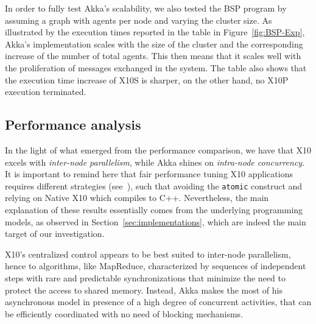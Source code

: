 \documentclass[a4paper]{article}
\numberwithin{equation}{section}
\begin{document}




In order to fully test Akka's scalability, we also tested 
the BSP program by assuming a graph with  agents per node and
varying the cluster size. As illustrated by the execution times
reported in the table in Figure~\ref{fig:BSP-Exp}, Akka's implementation scales with the
size of the cluster and the corresponding increase of the number of
total agents. This then means that it scales well with the
proliferation of messages exchanged in the system.  
The table also shows that the execution time increase of X10S
is sharper, on the other hand, no X10P execution
terminated. 

\subsection{Performance analysis}

In the light of what emerged from the performance comparison,
we have that X10 excels with \emph{inter-node parallelism},
while Akka shines on \emph{intra-node concurrency}. It is important to
remind here that fair performance tuning X10 applications requires
different strategies (see~\cite{X10PerformanceTuning}), such that
avoiding the \verb+atomic+ construct and relying on Native X10 which
compiles to C++. 
Nevertheless, the main explanation of these results essentially
comes from the underlying programming models, as observed in
Section~\ref{sec:implementations}, which are indeed the main target of
our investigation.  

X10's centralized control appears to be best suited to inter-node
parallelism, hence to algorithms, like MapReduce, characterized by
sequences of independent steps with rare and predictable
synchronizations that minimize the need to protect the access to
shared memory. 
Instead, Akka makes the most of his asynchronous model in presence of
a high degree of concurrent activities, that can be efficiently
coordinated with no need of blocking mechanisms.
\end{document}
